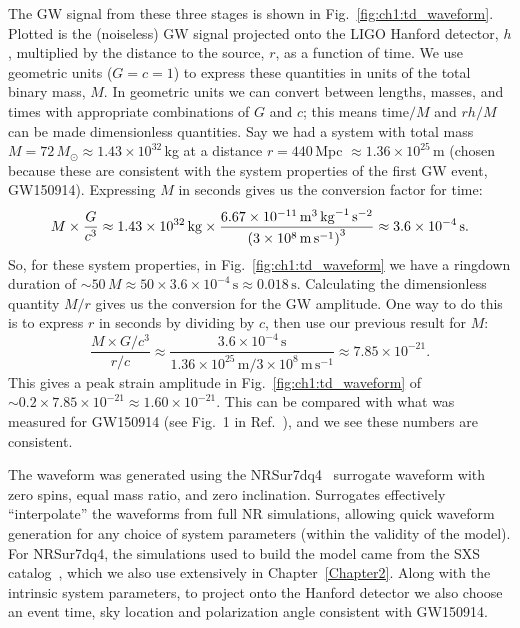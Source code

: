 The GW signal from these three stages is shown in Fig.~\ref{fig:ch1:td_waveform}.
Plotted is the (noiseless) GW signal projected onto the LIGO Hanford detector, $h$, multiplied by the distance to the source, $r$, as a function of time. 
We use geometric units ($G = c = 1$) to express these quantities in units of the total binary mass, $M$. 
In geometric units we can convert between lengths, masses, and times with appropriate combinations of $G$ and $c$; this means $\mathrm{time}/M$ and $rh/M$ can be made dimensionless quantities. 
Say we had a system with total mass $M = 72\, M_\odot \approx 1.43 \times 10^{32}\,$kg at a distance $r = 440\,$Mpc $\approx 1.36 \times 10^{25}\,$m (chosen because these are consistent with the system properties of the first GW event, GW150914). 
Expressing $M$ in seconds gives us the conversion factor for time:
\begin{equation}
    M \times \frac{G}{c^3} \approx 1.43 \times 10^{32}\, \mathrm{kg} \times \frac{6.67 \times 10^{-11}\, \mathrm{m}^3\, \mathrm{kg}^{-1}\, \mathrm{s}^{-2}}{\qty(3 \times 10^8\, \mathrm{m}\, \mathrm{s}^{-1})^3} \approx 3.6 \times 10^{-4}\, \mathrm{s}.
\end{equation}
So, for these system properties, in Fig.~\ref{fig:ch1:td_waveform} we have a ringdown duration of $\sim 50\, M \approx 50 \times 3.6 \times 10^{-4}\, \mathrm{s} \approx 0.018\, \mathrm{s}$. 
Calculating the dimensionless quantity $M/r$ gives us the conversion for the GW amplitude. 
One way to do this is to express $r$ in seconds by dividing by $c$, then use our previous result for $M$:
\begin{equation}
    \frac{M \times G/c^3}{r/c} \approx \frac{3.6 \times 10^{-4}\, \mathrm{s}}{1.36 \times 10^{25}\, \mathrm{m}/3 \times 10^8\, \mathrm{m}\, \mathrm{s}^{-1}} \approx 7.85 \times 10^{-21}.
\end{equation}
This gives a peak strain amplitude in Fig.~\ref{fig:ch1:td_waveform} of $\sim 0.2 \times 7.85 \times 10^{-21} \approx 1.60 \times 10^{-21}$. 
This can be compared with what was measured for GW150914 (see Fig.~1 in Ref.~\cite{LIGOScientific:2016aoc}), and we see these numbers are consistent.

The waveform was generated using the NRSur7dq4~\cite{Varma:2019csw} surrogate waveform with zero spins, equal mass ratio, and zero inclination. 
Surrogates effectively ``interpolate'' the waveforms from full NR simulations, allowing quick waveform generation for any choice of system parameters (within the validity of the model). 
For NRSur7dq4, the simulations used to build the model came from the SXS catalog~\cite{Boyle:2019kee}, which we also use extensively in Chapter~\ref{Chapter2}. 
Along with the intrinsic system parameters, to project onto the Hanford detector we also choose an event time, sky location and polarization angle consistent with GW150914. 

